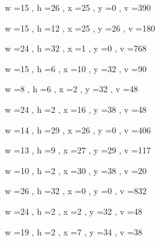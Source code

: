 \documentclass[11pt]{article}
\begin{document}
w =15 , h =26 , x =25 , y =0 , v =390
\par
w =15 , h =12 , x =25 , y =26 , v =180
\par
w =24 , h =32 , x =1 , y =0 , v =768
\par
w =15 , h =6 , x =10 , y =32 , v =90
\par
w =8 , h =6 , x =2 , y =32 , v =48
\par
w =24 , h =2 , x =16 , y =38 , v =48
\par
\newpage




w =14 , h =29 , x =26 , y =0 , v =406
\par
w =13 , h =9 , x =27 , y =29 , v =117
\par
w =10 , h =2 , x =30 , y =38 , v =20
\par
w =26 , h =32 , x =0 , y =0 , v =832
\par
w =24 , h =2 , x =2 , y =32 , v =48
\par
w =19 , h =2 , x =7 , y =34 , v =38
\par
\newpage
\end{document}
